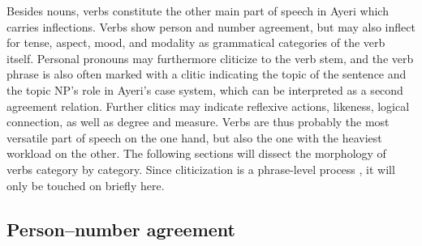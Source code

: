 Besides nouns, verbs constitute the other main part of speech in Ayeri which 
carries inflections. Verbs show person and number agreement, but may also 
inflect for tense, aspect, mood, and modality as grammatical categories of the 
verb itself. Personal pronouns may furthermore cliticize to the verb stem, and 
the verb phrase is also often marked with a clitic indicating the topic of 
the sentence and the topic NP's role in Ayeri's case system, which can be 
interpreted as a second agreement relation. Further clitics may indicate 
reflexive actions, likeness, logical connection, as well as degree and measure. 
Verbs are thus probably the most versatile part of speech on the one hand, but 
also the one with the heaviest workload on the other. The following sections 
will dissect the morphology of verbs category by category. Since cliticization 
is a phrase-level process \citep{klavans1985}, it will only be touched on 
briefly here.

\subsection{Person--number agreement}

